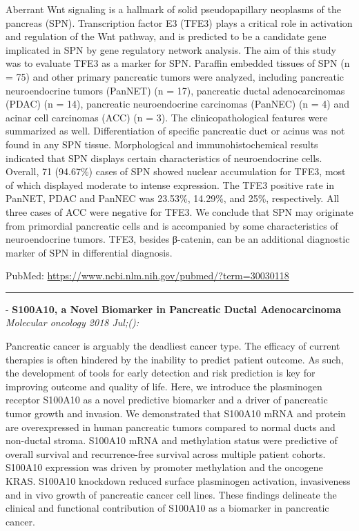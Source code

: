 \documentclass[]{article}
\begin{document}
Aberrant Wnt signaling is a hallmark of solid pseudopapillary neoplasms
of the pancreas (SPN). Transcription factor E3 (TFE3) plays a critical
role in activation and regulation of the Wnt pathway, and is predicted
to be a candidate gene implicated in SPN by gene regulatory network
analysis. The aim of this study was to evaluate TFE3 as a marker for
SPN. Paraffin embedded tissues of SPN (n = 75) and other primary
pancreatic tumors were analyzed, including pancreatic neuroendocrine
tumors (PanNET) (n = 17), pancreatic ductal adenocarcinomas (PDAC) (n =
14), pancreatic neuroendocrine carcinomas (PanNEC) (n = 4) and acinar
cell carcinomas (ACC) (n = 3). The clinicopathological features were
summarized as well. Differentiation of specific pancreatic duct or
acinus was not found in any SPN tissue. Morphological and
immunohistochemical results indicated that SPN displays certain
characteristics of neuroendocrine cells. Overall, 71 (94.67\%) cases of
SPN showed nuclear accumulation for TFE3, most of which displayed
moderate to intense expression. The TFE3 positive rate in PanNET, PDAC
and PanNEC was 23.53\%, 14.29\%, and 25\%, respectively. All three cases
of ACC were negative for TFE3. We conclude that SPN may originate from
primordial pancreatic cells and is accompanied by some characteristics
of neuroendocrine tumors. TFE3, besides β-catenin, can be an additional
diagnostic marker of SPN in differential diagnosis.

PubMed: \url{https://www.ncbi.nlm.nih.gov/pubmed/?term=30030118}

{}

{}

\begin{center}\rule{0.5\linewidth}{\linethickness}\end{center}

 - \textbf{S100A10, a Novel Biomarker in Pancreatic Ductal
Adenocarcinoma} \emph{Molecular oncology 2018 Jul;():}

Pancreatic cancer is arguably the deadliest cancer type. The efficacy of
current therapies is often hindered by the inability to predict patient
outcome. As such, the development of tools for early detection and risk
prediction is key for improving outcome and quality of life. Here, we
introduce the plasminogen receptor S100A10 as a novel predictive
biomarker and a driver of pancreatic tumor growth and invasion. We
demonstrated that S100A10 mRNA and protein are overexpressed in human
pancreatic tumors compared to normal ducts and non-ductal stroma.
S100A10 mRNA and methylation status were predictive of overall survival
and recurrence-free survival across multiple patient cohorts. S100A10
expression was driven by promoter methylation and the oncogene KRAS.
S100A10 knockdown reduced surface plasminogen activation, invasiveness
and in vivo growth of pancreatic cancer cell lines. These findings
delineate the clinical and functional contribution of S100A10 as a
biomarker in pancreatic cancer.
\end{document}
